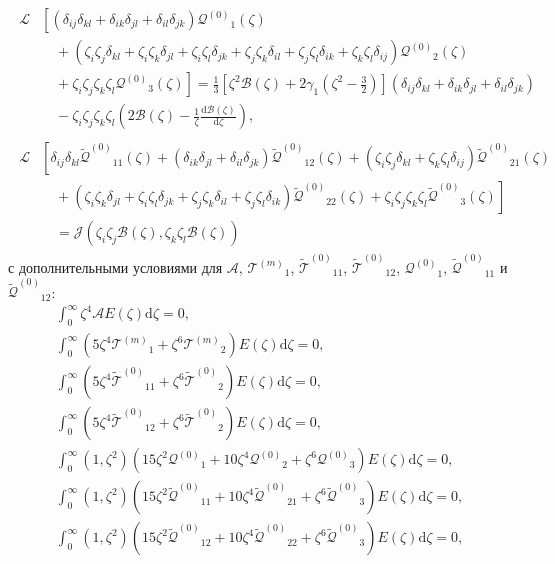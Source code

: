 \documentclass[a4paper,12pt]{article}
\newcommand{\dd}{\mathrm{d}}
\newcommand{\der}[2][]{\frac{\dd#1}{\dd#2}}
\newcommand{\Q}{\ensuremath{\mathcal{Q}^{(0)}}}
\newcommand{\T}[1]{\ensuremath{\mathcal{T}^{(#1)}}}
\newcommand{\TT}{\ensuremath{\tilde{\mathcal{T}}^{(0)}}}
\newcommand{\QQ}{\ensuremath{\tilde{\mathcal{Q}}^{(0)}}}
\newcommand{\ZZD}[3]{\zeta_{#1}\zeta_{#2}\delta_{#3}}
\newcommand{\ZZZZ}{\zeta_i\zeta_j\zeta_k\zeta_l}
\newcommand{\DD}[2]{\delta_{#1}\delta_{#2}}
\begin{document}
\begin{gather}
    \begin{aligned}
    \mathcal{L}&\left[(\DD{ij}{kl}+\DD{ik}{jl}+\DD{il}{jk}) \Q_1(\zeta) \right. \\
        &\quad + \left.(\ZZD{i}{j}{kl}+\ZZD{i}{k}{jl}+\ZZD{i}{l}{jk}+\ZZD{j}{k}{il}+\ZZD{j}{l}{ik}+\ZZD{k}{l}{ij}) \Q_2(\zeta)\right. \\
        &\quad + \left.\ZZZZ \Q_3(\zeta)\right] = \frac13\left[\zeta^2\mathcal{B}(\zeta)+2\gamma_1\left(\zeta^2-\frac32\right)\right](\DD{ij}{kl}+\DD{ik}{jl}+\DD{il}{jk}) \\
        &\quad - \ZZZZ\left(2\mathcal{B}(\zeta) - \frac1\zeta\der[\mathcal{B}(\zeta)]{\zeta}\right),
    \end{aligned}\label{eq:Q}\\[6pt]
    \begin{aligned}
    \mathcal{L}&\left[\DD{ij}{kl}\QQ_{11}(\zeta) + (\DD{ik}{jl}+\DD{il}{jk})\QQ_{12}(\zeta) + (\ZZD{i}{j}{kl}+\ZZD{k}{l}{ij})\QQ_{21}(\zeta) \right. \\
        &\quad + \left.(\ZZD{i}{k}{jl}+\ZZD{i}{l}{jk}+\ZZD{j}{k}{il}+\ZZD{j}{l}{ik}) \QQ_{22}(\zeta) + \ZZZZ \QQ_3(\zeta)\right] \\
        &\quad = \mathcal{J}(\zeta_i\zeta_j\mathcal{B}(\zeta), \zeta_k\zeta_l\mathcal{B}(\zeta))
    \end{aligned}\label{eq:QQ}
\end{gather}
с дополнительными условиями для \(\mathcal{A}\), \(\T{m}_1\), \(\TT_{11}\), \(\TT_{12}\), \(\Q_1\), \(\QQ_{11}\) и \(\QQ_{12}\):
\begin{gather}
    \int_0^\infty \zeta^4 \mathcal{A} E(\zeta) \dd\zeta = 0, \label{eq:A_constraint}\\
    \int_0^\infty \left( 5\zeta^4\T{m}_1 + \zeta^6\T{m}_2 \right) E(\zeta) \dd\zeta = 0, \label{eq:Tm_constraint}\\
    \int_0^\infty \left( 5\zeta^4\TT_{11} + \zeta^6\TT_2 \right) E(\zeta) \dd\zeta = 0, \label{eq:T11_constraint}\\
    \int_0^\infty \left( 5\zeta^4\TT_{12} + \zeta^6\TT_2 \right) E(\zeta) \dd\zeta = 0, \label{eq:T12_constraint}\\
    \int_0^\infty (1,\zeta^2)\left( 15\zeta^2\Q_1 + 10\zeta^4\Q_2 + \zeta^6\Q_3 \right) E(\zeta) \dd\zeta = 0, \\
    \int_0^\infty (1,\zeta^2)\left( 15\zeta^2\QQ_{11} + 10\zeta^4\QQ_{21} + \zeta^6\QQ_3 \right) E(\zeta) \dd\zeta = 0, \\
    \int_0^\infty (1,\zeta^2)\left( 15\zeta^2\QQ_{12} + 10\zeta^4\QQ_{22} + \zeta^6\QQ_3 \right) E(\zeta) \dd\zeta = 0,
\end{gather}
\end{document}
